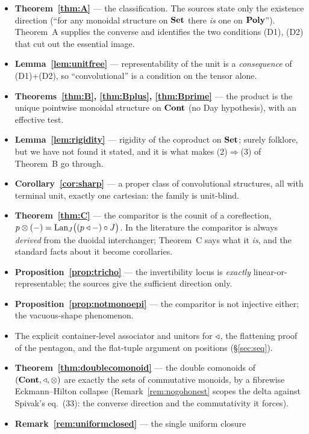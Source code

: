 \begin{itemize}[nosep]
\item \textbf{Theorem~\ref{thm:A}} --- the classification. The sources state only
  the existence direction (``for any monoidal structure on $\mathbf{Set}$ there
  \emph{is} one on $\mathbf{Poly}$''). Theorem~A supplies the converse and identifies
  the two conditions (D1), (D2) that cut out the essential image.
\item \textbf{Lemma~\ref{lem:unitfree}} --- representability of the unit is a
  \emph{consequence} of (D1)+(D2), so ``convolutional'' is a condition on the
  tensor alone.
\item \textbf{Theorems~\ref{thm:B}, \ref{thm:Bplus}, \ref{thm:Bprime}} --- the
  product is the unique pointwise monoidal structure on $\mathbf{Cont}$ (no Day
  hypothesis), with an effective test.
\item \textbf{Lemma~\ref{lem:rigidity}} --- rigidity of the coproduct on $\mathbf{Set}$;
  surely folklore, but we have not found it stated, and it is what makes
  (2)$\Rightarrow$(3) of Theorem~B go through.
\item \textbf{Corollary~\ref{cor:sharp}} --- a proper class of convolutional
  structures, all with terminal unit, exactly one cartesian: the family is
  unit-blind.
\item \textbf{Theorem~\ref{thm:C}} --- the comparitor is the counit of a
  coreflection, $p\mathbin{\otimes}(-)=\mathrm{Lan}_J\bigl((p\mathbin{\triangleleft}-)\circ J\bigr)$. In the literature
  the comparitor is always \emph{derived} from the duoidal interchanger;
  Theorem~C says what it \emph{is}, and the standard facts about it become
  corollaries.
\item \textbf{Proposition~\ref{prop:tricho}} --- the invertibility locus is
  \emph{exactly} linear-or-representable; the sources give the sufficient
  direction only.
\item \textbf{Proposition~\ref{prop:notmonoepi}} --- the comparitor is not
  injective either; the vacuous-shape phenomenon.
\item The explicit container-level associator and unitors for $\mathbin{\triangleleft}$, the
  flattening proof of the pentagon, and the flat-tuple argument on positions
  (§\ref{sec:seq}).
\item \textbf{Theorem~\ref{thm:doublecomonoid}} --- the double comonoids of
  $(\mathbf{Cont},\mathbin{\triangleleft},\mathbin{\otimes})$ are exactly the sets of commutative monoids, by a fibrewise
  Eckmann--Hilton collapse (Remark~\ref{rem:nogohonest} scopes the delta against
  Spivak's eq.~(33): the converse direction and the commutativity it forces).
\item \textbf{Remark~\ref{rem:uniformclosed}} --- the single uniform closure

\end{itemize}

